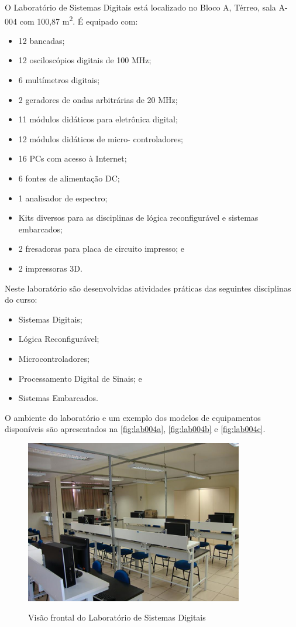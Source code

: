 O Laboratório de Sistemas Digitais está localizado no Bloco A, Térreo, sala A-004 com 100,87 m\textsuperscript{2}. É equipado com:

\begin{itemize}
    \item 12 bancadas;
    \item 12 osciloscópios digitais de 100 MHz;
    \item 6 multímetros digitais;
    \item 2 geradores de ondas arbitrárias de 20 MHz;
    \item 11 módulos didáticos para eletrônica digital; 
    \item 12 módulos didáticos de micro- controladores; 
    \item 16 PCs com acesso à Internet; 
    \item 6 fontes de alimentação DC;
    \item 1 analisador de espectro;
    \item Kits diversos para as disciplinas de lógica reconfigurável e sistemas embarcados;
    \item 2 fresadoras para placa de circuito impresso; e
    \item 2 impressoras 3D.   
\end{itemize}

Neste laboratório são desenvolvidas atividades práticas das seguintes disciplinas do curso:

\begin{itemize}
    \item Sistemas Digitais;
    \item Lógica Reconfigurável;
    \item Microcontroladores;
    \item Processamento Digital de Sinais; e
    \item Sistemas Embarcados.    
\end{itemize}

O ambiente do laboratório e um exemplo dos modelos de equipamentos disponíveis são apresentados na \autoref{fig:lab004a}, \autoref{fig:lab004b} e \autoref{fig:lab004c}.

\begin{figure}[!htb]
    \centering
    \caption{Visão frontal do Laboratório de Sistemas Digitais}
    \includegraphics[width=0.85\textwidth]{Caps/Figs/lab004a.png}
    \fonte{\utf}
    \label{fig:lab004a}
\end{figure}


